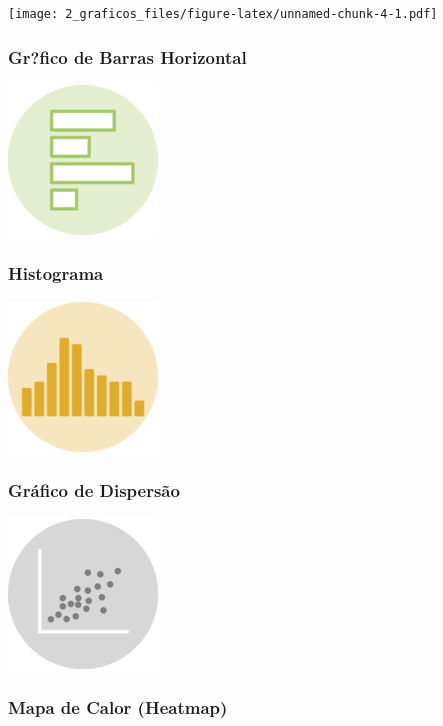 \documentclass[]{article}
\begin{document}
\texttt{[image: 2\_graficos\_files/figure-latex/unnamed-chunk-4-1.pdf]}

\hypertarget{grfico-de-barras-horizontal}{%
\subsubsection{Gr?fico de Barras
Horizontal}\label{grfico-de-barras-horizontal}}

\includegraphics{img/horizontal_barchart.png}

\hypertarget{histograma}{%
\subsubsection{Histograma}\label{histograma}}

\includegraphics{img/histograma.png}

\hypertarget{grafico-de-dispersao}{%
\subsubsection{Gráfico de Dispersão}\label{grafico-de-dispersao}}

\includegraphics{img/scatterplot.png}

\hypertarget{mapa-de-calor-heatmap}{%
\subsubsection{Mapa de Calor (Heatmap)}\label{mapa-de-calor-heatmap}}
\end{document}
